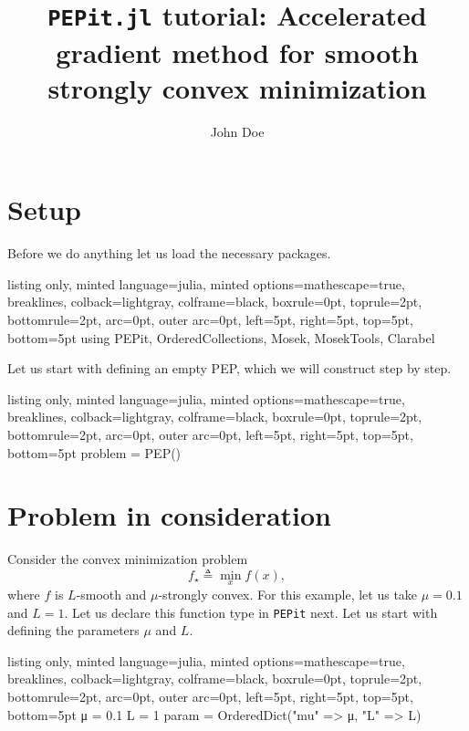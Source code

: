 \documentclass{article}
\title{\textbf{\textsf{\texttt{PEPit.jl} tutorial: Accelerated gradient method for smooth strongly convex minimization}}}
\author{John Doe}
\begin{document}
    \maketitle
    
    

\section{Setup}
Before we do anything let us load the necessary packages.

\begin{tcblisting}{listing only, minted language=julia, minted options={mathescape=true, breaklines}, colback=lightgray, colframe=black, boxrule=0pt, toprule=2pt, bottomrule=2pt, arc=0pt, outer arc=0pt, left=5pt, right=5pt, top=5pt, bottom=5pt}
using PEPit, OrderedCollections, Mosek, MosekTools, Clarabel
\end{tcblisting}


Let us start with defining an empty PEP, which we will construct step by step.

\begin{tcblisting}{listing only, minted language=julia, minted options={mathescape=true, breaklines}, colback=lightgray, colframe=black, boxrule=0pt, toprule=2pt, bottomrule=2pt, arc=0pt, outer arc=0pt, left=5pt, right=5pt, top=5pt, bottom=5pt}
problem = PEP()
\end{tcblisting}


\section{Problem in consideration}

Consider the convex minimization problem
\begin{equation*}
f_\star \triangleq \min_x f(x),
\end{equation*}
where $f$ is $L$-smooth and $\mu$-strongly convex. For this example, let us take $\mu=0.1$ and $L=1$. Let us declare this function type in \texttt{PEPit} next. Let us start with defining the parameters $\mu$ and $L$. 

\begin{tcblisting}{listing only, minted language=julia, minted options={mathescape=true, breaklines}, colback=lightgray, colframe=black, boxrule=0pt, toprule=2pt, bottomrule=2pt, arc=0pt, outer arc=0pt, left=5pt, right=5pt, top=5pt, bottom=5pt}
μ = 0.1
L = 1
param = OrderedDict("mu" => μ, "L" => L)
\end{tcblisting}
\end{document}
